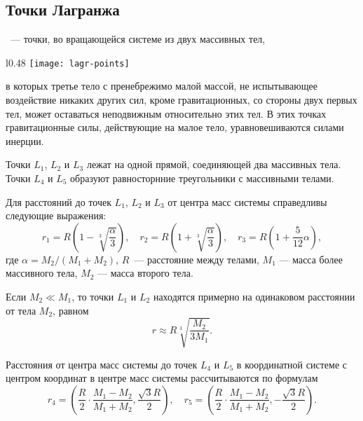 \subsection{Точки Лагранжа}

~--- точки, во вращающейся системе из двух массивных тел,
\begin{wrapfigure}[14]{l}{0.48\tw}
	\centering
	\vspace{-.5pc}
	\texttt{[image: lagr-points]}
	\label{pic:larg-points}	
\end{wrapfigure}
в которых третье тело с пренебрежимо 
малой массой, не испытывающее воздействие никаких 
других сил, кроме гравитационных, со стороны двух 
первых тел, может оставаться неподвижным относительно 
этих тел. В этих точках гравитационные силы, 
действующие на малое тело, уравновешиваются силами инерции.

Точки $L_1$, $L_2$ и $L_3$ лежат на одной прямой, 
соединяющей два массивных тела. Точки $L_4$ и $L_5$ 
образуют равносторнние треугольники с массивными 
телами.

Для расстояний до точек $L_1$, $L_2$ и $L_3$ от 
центра масс системы справедливы следующие выражения:
\begin{equation}r_1=R\left(1-\sqrt[3]{\frac{\alpha}
{3}}\right), \quad r_2=R\left(1+\sqrt[3]{\frac{\alpha}
{3}}\right), \quad r_3=R\left(1+\frac{5}{12}\alpha\right),
\end{equation}
где $\alpha=M_2 / (M_1 + M_2)$, $R$~--- расстояние между 
телами, $M_1$ --- масса более массивного тела, $M_2$
 --- масса второго тела.

Если $M_2 \ll M_1$, то точки $L_1$ и $L_2$ находятся 
примерно на одинаковом расстоянии от тела $M_2$, равном
\begin{equation}
r\approx R\sqrt[3]{\frac{M_2}{3M_1}}.
\end{equation}

Расстояния от центра масс системы до точек $L_4$ и $L_5$ в координатной системе с центром координат в центре масс системы рассчитываются по  формулам
\begin{equation}
	 r_4 = \left ( \frac{R}{2} \cdot \frac{M_1-M_2}{M_1+M_2} ,   \frac{\sqrt{3}R}{2} \right ), \quad r_5 = \left ( \frac{R}{2} \cdot \frac{M_1-M_2}{M_1+M_2} ,   -\frac{\sqrt{3}R}{2} \right ). 
\end{equation}